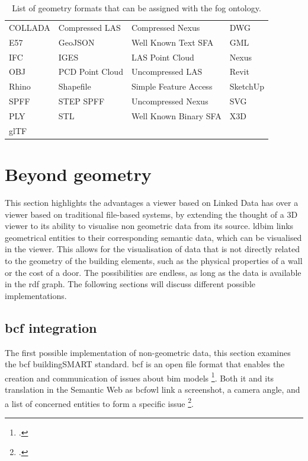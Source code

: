 \begin{table}[H]
    \centering
    \begin{tabular}{llll}
        \toprule
        COLLADA & Compressed LAS  & Compressed Nexus      & DWG      \\
        E57     & GeoJSON         & Well Known Text SFA   & GML      \\
        IFC     & IGES            & LAS Point Cloud       & Nexus    \\
        OBJ     & PCD Point Cloud & Uncompressed LAS      & Revit    \\
        Rhino   & Shapefile       & Simple Feature Access & SketchUp \\
        SPFF    & STEP SPFF       & Uncompressed Nexus    & SVG      \\
        PLY     & STL             & Well Known Binary SFA & X3D      \\
        glTF    &                 &                       &          \\ \bottomrule
    \end{tabular}
    \caption[\acs{fog} ontology geometry formats]{List of geometry formats that can be assigned with the \acs{fog} ontology.\footnotemark}
    \label{tab:geometryFormats}
\end{table}

\section{Beyond geometry} \label{sec:beyondGeometry}
This section highlights the advantages a viewer based on Linked Data has over a viewer based on traditional file-based systems, by extending the thought of a 3D viewer to its ability to visualise non geometric data from its source. \ac{ldbim} links geometrical entities to their corresponding semantic data, which can be visualised in the viewer. This allows for the visualisation of data that is not directly related to the geometry of the building elements, such as the physical properties of a wall or the cost of a door. The possibilities are endless, as long as the data is available in the \ac{rdf} graph. The following sections will discuss different possible implementations.


\subsection{\acs{bcf} integration} \label{sec:bcf}
The first possible implementation of non-geometric data, this section examines the \ac{bcf} buildingSMART standard. \ac{bcf} is an open file format that enables the creation and communication of issues about \ac{bim} models \footcite{bcf}. Both it and its translation in the Semantic Web as \ac{bcfowl} \parencite{bcfOWL} link a screenshot, a camera angle, and a list of concerned entities to form a specific issue \footcite{bcfCollab}.

